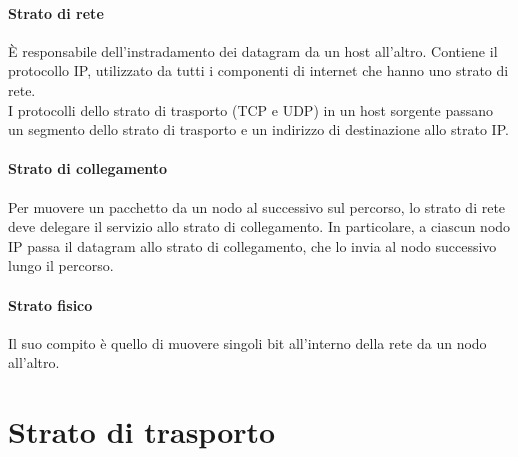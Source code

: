 \documentclass[11pt,a4paper]{article}
\begin{document}
\paragraph{Strato di rete}
È responsabile dell'instradamento dei datagram da un host all'altro. Contiene il protocollo IP, utilizzato da tutti i componenti di internet che hanno uno strato di rete. \\
I protocolli dello strato di trasporto (TCP e UDP) in un host sorgente passano un segmento dello strato di trasporto e un indirizzo di destinazione allo strato IP.
\paragraph{Strato di collegamento}
Per muovere un pacchetto da un nodo al successivo sul percorso, lo strato di rete deve delegare il servizio allo strato di collegamento. In particolare, a ciascun nodo IP passa il datagram allo strato di collegamento, che lo invia al nodo successivo lungo il percorso.
\paragraph{Strato fisico}
Il suo compito è quello di muovere singoli bit all'interno della rete da un nodo all'altro.
\pagebreak

\section{Strato di trasporto}
\end{document}
